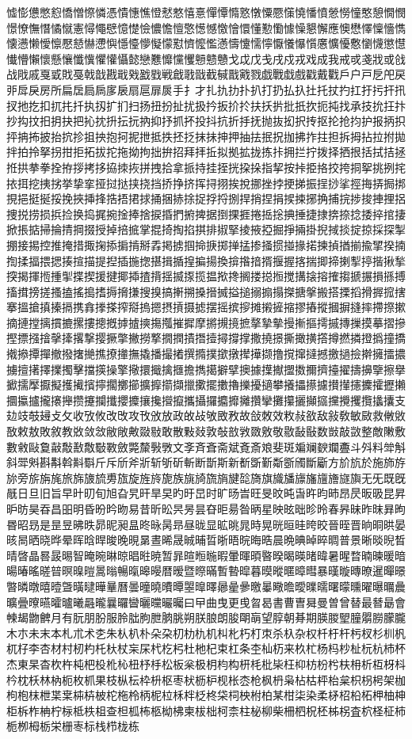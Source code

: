 憈憉憊憋憌憍憎憏憐憑憒憓憔憕憖憗憘憙憚憛憜憝憞憟憠憡憢憣憤憥憦憧憨憩憪憫憬憭憮憯憰憱憲憳憴憵憶憷憸憹憺憻憼憽憾憿懀懁懂懃懄懅懆懇懈應懊懋懌懍懎懏懐懑懒懓懔懕懖懗懘懙懚懛懜懝懞懟懠懡懢懣懤懥懦懧懨懩懪懫懬懭懮懯懰懱懲懳懴懵懶懷懸懹懺懻懼懽懾懿戀戁戂戃戄戅戆戇戈戉戊戋戌戍戎戏成我戒戓戔戕或戗战戙戚戛戜戝戞戟戠戡戢戣戤戥戦戧戨戩截戫戬戭戮戯戰戱戲戳戴戵戶户戸戹戺戻戼戽戾房所扁扂扃扄扅扆扇扈扉扊手扌才扎扏扐扑扒打扔払扖扗托扙扚扛扜扝扞扟扠扡扢扣扤扥扦执扨扩扪扫扬扭扮扯扰扱扲扳扴扵扶扷扸批扺扻扼扽找承技抁抂抃抄抅抆抇抈抉把抋抌抍抎抏抐抑抒抓抔投抖抗折抙抚抛抜抝択抟抠抡抢抣护报抦抧抨抩抪披抬抭抮抯抰抱抲抳抴抵抶抷抸抹抺抻押抽抾抿拀拁拂拃拄担拆拇拈拉拊拋拌拍拎拏拐拑拒拓拔拕拖拗拘拙拚招拜拝拞拟拠拡拢拣拤拥拦拧拨择拪拫括拭拮拯拰拱拲拳拴拵拶拷拸拹拺拻拼拽拾拿挀持挂挃挄挅挆指挈按挊挋挌挍挎挏挐挑挒挓挔挕挖挗挘挙挚挛挜挝挞挟挠挡挢挣挤挥挦挧挨挩挪挫挬挭挮振挰挱挲挳挴挵挶挷挸挹挺挻挼挽挾挿捀捁捂捃捄捅捆捇捈捉捊捋捌捍捎捏捐捑捒捓捔捕捖捗捘捙捚捛捜捝捞损捠捡换捣捤捥捦捧捨捩捪捫捬捭据捯捰捱捲捳捴捵捶捷捸捹捺捻捼捽捾捿掀掁掂掃掄掅掆掇授掉掊掋掌掍掎掏掐掑排掓掔掕掖掗掘掙掚掛掜掝掞掟掠採探掣掤接掦控推掩措掫掬掭掮掯掰掱掲掳掴掵掶掷掸掹掺掻掼掽掾掿揀揁揂揃揄揅揆揇揈揉揊揋揌揍揎描提揑插揓揔揕揖揗揘揙揚換揜揝揞揟揠握揢揣揤揥揦揧揨揩揪揫揬揭揮揯揰揱揲揳援揵揶揷揸揹揺揻揼揽揾揿搀搁搂搃搄搅搆搇搈搉搊搋搌損搎搏搐搑搒搓搔搕搖搗搘搙搚搛搜搝搞搟搠搡搢搣搤搥搦搧搨搩搪搫搬搭搮搯搰搱搲搳搴搵搶搷搸搹携搻搼搽搾搿摀摁摂摃摄摅摆摇摈摉摊摋摌摍摎摏摐摑摒摓摔摕摖摗摘摙摚摛摜摝摞摟摠摡摢摣摤摥摦摧摨摩摪摫摬摭摮摯摰摱摲摳摴摵摶摷摸摹摺摻摼摽摾摿撀撁撂撃撄撅撆撇撈撉撊撋撌撍撎撏撐撑撒撓撔撕撖撗撘撙撚撛撜撝撞撟撠撡撢撣撤撥撦撧撨撩撪撫撬播撮撯撰撱撲撳撴撵撶撷撸撹撺撻撼撽撾撿擀擁擂擃擄擅擆擇擈擉擊擋擌操擎擏擐擑擒擓擔擕擖擗擘擙據擛擜擝擞擟擠擡擢擣擤擥擦擧擨擩擪擫擬擭擮擯擰擱擲擳擴擵擶擷擸擹擺擻擼擽擾擿攀攁攂攃攄攅攆攇攈攉攊攋攌攍攎攏攐攑攒攓攔攕攖攗攘攙攚攛攜攝攞攟攠攡攢攣攤攥攦攧攨攩攪攫攬攭攮支攰攱攲攳攴攵收攷攸改攺攻攼攽放政敀敁敂敃敄故敆敇效敉敊敋敌敍敎敏敐救敒敓敔敕敖敗敘教敚敛敜敝敞敟敠敡敢散敤敥敦敧敨敩敪敫敬敭敮敯数敱敲敳整敵敶敷數敹敺敻敼敽敾敿斀斁斂斃斄斅斆文斈斉斊斋斌斍斎斏斐斑斒斓斔斕斖斗斘料斚斛斜斝斞斟斠斡斢斣斤斥斦斧斨斩斪斫斬断斮斯新斱斲斳斴斵斶斷斸方斺斻於施斾斿旀旁旂旃旄旅旆旇旈旉旊旋旌旍旎族旐旑旒旓旔旕旖旗旘旙旚旛旜旝旞旟无旡既旣旤日旦旧旨早旪旫旬旭旮旯旰旱旲旳旴旵时旷旸旹旺旻旼旽旾旿昀昁昂昃昄昅昆昇昈昉昊昋昌昍明昏昐昑昒易昔昕昖昗昘昙昚昛昜昝昞星映昡昢昣昤春昦昧昨昩昪昫昬昭昮是昰昱昲昳昴昵昶昷昸昹昺昻昼昽显昿晀晁時晃晄晅晆晇晈晉晊晋晌晍晎晏晐晑晒晓晔晕晖晗晘晙晚晛晜晝晞晟晠晡晢晣晤晥晦晧晨晩晪晫晬晭普景晰晱晲晳晴晵晶晷晸晹智晻晼晽晾晿暀暁暂暃暄暅暆暇暈暉暊暋暌暍暎暏暐暑暒暓暔暕暖暗暘暙暚暛暜暝暞暟暠暡暢暣暤暥暦暧暨暩暪暫暬暭暮暯暰暱暲暳暴暵暶暷暸暹暺暻暼暽暾暿曀曁曂曃曄曅曆曇曈曉曊曋曌曍曎曏曐曑曒曓曔曕曖曗曘曙曚曛曜曝曞曟曠曡曢曣曤曥曦曧曨曩曪曫曬曭曮曯曰曱曲曳更曵曶曷書曹曺曻曼曽曾替最朁朂會朄朅朆朇月有朊朋朌服朎朏朐朑朒朓朔朕朖朗朘朙朚望朜朝朞期朠朡朢朣朤朥朦朧木朩未末本札朮术朰朱朲朳朴朵朶朷朸朹机朻朼朽朾朿杀杁杂权杄杅杆杇杈杉杊杋杌杍李杏材村杒杓杔杕杖杗杘杙杚杛杜杝杞束杠条杢杣杤来杦杧杨杩杪杫杬杭杮杯杰東杲杳杴杵杶杷杸杹杺杻杼杽松板枀极枂枃构枅枆枇枈枉枊枋枌枍枎枏析枑枒枓枔枕枖林枘枙枚枛果枝枞枟枠枡枢枣枤枥枦枧枨枩枪枫枬枭枮枯枰枱枲枳枴枵架枷枸枹枺枻枼枽枾枿柀柁柂柃柄柅柆柇柈柉柊柋柌柍柎柏某柑柒染柔柕柖柗柘柙柚柛柜柝柞柟柠柡柢柣柤查柦柧柨柩柪柫柬柭柮柯柰柱柲柳柴柵柶柷柸柹柺査柼柽柾柿栀栁栂栃栄栅栆标栈栉栊栋